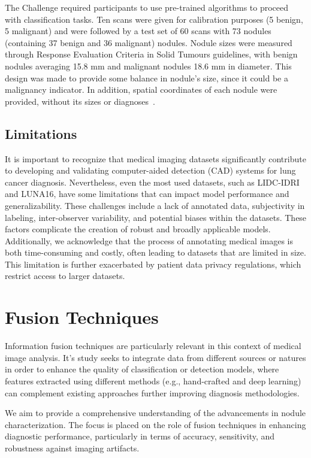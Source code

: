 The Challenge required participants to use pre-trained algorithms to proceed with classification tasks. Ten scans were given for calibration purposes (5 benign, 5 malignant) and were followed by a test set of 60 scans with 73 nodules (containing 37 benign and 36 malignant) nodules. 
Nodule sizes were measured through Response Evaluation Criteria in Solid Tumours guidelines, with benign nodules averaging 15.8 mm and malignant nodules 18.6 mm in diameter. This design was made to provide some balance in nodule's size, since it could be a malignancy indicator. In addition, spatial coordinates of each nodule were provided, without its sizes or diagnoses~\cite{kirby_lungx_2016}.

\subsection{Limitations}

It is important to recognize that medical imaging datasets significantly contribute to developing and validating computer-aided detection (CAD) systems for lung cancer diagnosis. Nevertheless, even the most used datasets, such as LIDC-IDRI and LUNA16, have some limitations that can impact model performance and generalizability. These challenges include a lack of annotated data, subjectivity in labeling, inter-observer variability, and potential biases within the datasets. These factors complicate the creation of robust and broadly applicable models. Additionally, we acknowledge that the process of annotating medical images is both time-consuming and costly, often leading to datasets that are limited in size. This limitation is further exacerbated by patient data privacy regulations, which restrict access to larger datasets.~\cite{gu_survey_2021}
   
\section{Fusion Techniques}
Information fusion techniques are particularly relevant in this context of medical image analysis. It's study seeks to integrate data from different sources or natures in order to enhance the quality of classification or detection models, where features extracted using different methods (e.g., hand-crafted and deep learning) can complement existing approaches further improving diagnosis methodologies.

We aim to provide a comprehensive understanding of the advancements in nodule characterization. The focus is placed on the role of fusion techniques in enhancing diagnostic performance, particularly in terms of accuracy, sensitivity, and robustness against imaging artifacts.


